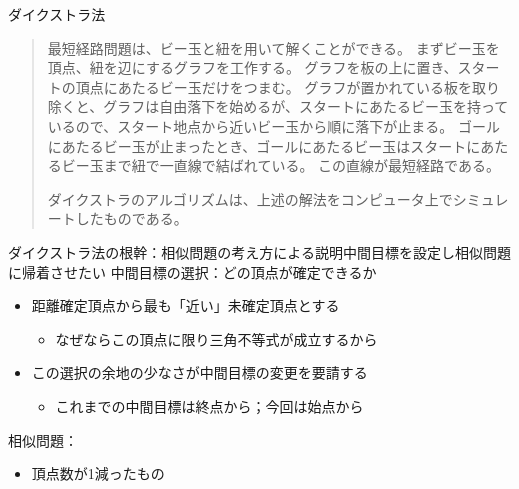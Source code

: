 \documentclass{beamer}
\begin{document}
\begin{frame}[fragile]{ダイクストラ法}{
}
\begin{quotation}
\fontsize{9}{12}\selectfont
最短経路問題は、ビー玉と紐を用いて解くことができる。
まずビー玉を頂点、紐を辺にするグラフを工作する。
グラフを板の上に置き、スタートの頂点にあたるビー玉だけをつまむ。
グラフが置かれている板を取り除くと、グラフは自由落下を始めるが、スタートにあたるビー玉を持っているので、スタート地点から近いビー玉から順に落下が止まる。
ゴールにあたるビー玉が止まったとき、ゴールにあたるビー玉はスタートにあたるビー玉まで紐で一直線で結ばれている。
この直線が最短経路である。

ダイクストラのアルゴリズムは、上述の解法をコンピュータ上でシミュレートしたものである。
\end{quotation}
\end{frame}

\begin{frame}[fragile]{ダイクストラ法の根幹：相似問題の考え方による説明}{中間目標を設定し相似問題に帰着させたい}
中間目標の選択：どの頂点が確定できるか
\begin{itemize}\itemsep8pt
\item 距離確定頂点から最も「近い」未確定頂点とする
\begin{itemize}%
\item なぜならこの頂点に限り三角不等式が成立するから

\begin{center}
\end{center}

\end{itemize}
\item この選択の余地の少なさが中間目標の変更を要請する
\begin{itemize}%
\item これまでの中間目標は終点から；今回は始点から
\end{itemize}
\end{itemize}

\vfill
相似問題：
\begin{itemize}\itemsep8pt
\item 頂点数が1減ったもの
\end{itemize}

\end{frame}
\end{document}
